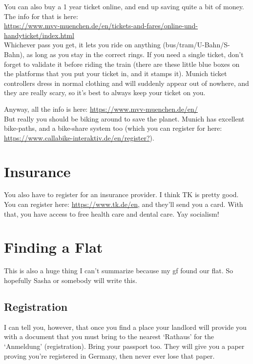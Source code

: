 \documentclass[11pt]{report}
\begin{document}
You can also buy a 1 year ticket online, and end up saving quite a bit of money. The info for that is here:\\
\href{https://www.mvv-muenchen.de/en/tickets-and-fares/online-und-handyticket/index.html}{\scriptsize https://www.mvv-muenchen.de/en/tickets-and-fares/online-und-handyticket/index.html}\\

Whichever pass you get, it lets you ride on anything (bus/tram/U-Bahn/S-Bahn), as long as you stay in the correct rings. If you need a single ticket, don't forget to validate it before riding the train (there are these little blue boxes on the platforms that you put your ticket in, and it stamps it). Munich ticket controllers dress in normal clothing and will suddenly appear out of nowhere, and they are really scary, so it's best to always keep your ticket on you.

Anyway, all the info is here: \href{https://www.mvv-muenchen.de/en/}{https://www.mvv-muenchen.de/en/}\\

But really you should be biking around to save the planet. Munich has excellent bike-paths, and a bike-share system too (which you can register for here: \href{https://www.callabike-interaktiv.de/en/register?}{https://www.callabike-interaktiv.de/en/register?}).

\section{Insurance}
You also have to register for an insurance provider. I think TK is pretty good. You can register here: \href{https://www.tk.de/en}{https://www.tk.de/en}, and they'll send you a card. With that, you have access to free health care and dental care. Yay socialism!

\section{Finding a Flat}
This is also a huge thing I can't summarize because my gf found our flat. So hopefully Sasha or somebody will write this.

\subsection{Registration}
I can tell you, however, that once you find a place your landlord will provide you with a document that you must bring to the nearest `Rathaus' for the `Anmeldung' (registration). Bring your passport too. They will give you a paper proving you're registered in Germany, then never ever lose that paper.
\end{document}
